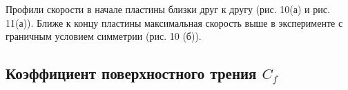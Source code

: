 \documentclass{article}
\newcommand{\n}{\vspace{\baselineskip}}
\newcommand{\tabscale}[1]{\renewcommand{\arraystretch}{#1}}
\begin{document}
\n
Профили скорости в начале пластины  близки друг к другу (рис. 10(а) и рис. 11(а)). Ближе к концу пластины максимальная скорость выше в эксперименте с граничным условием симметрии (рис. 10 (б)).

\subsection{Коэффициент поверхностного трения $C_f$}

\tabscale{1}

\begin{minipage}{\linewidth}
  \begin{minipage}{0.5\linewidth}
  \end{minipage}
  \hfill
  \begin{minipage}{0.5\linewidth}
  \end{minipage}
\end{minipage}
\end{document}
